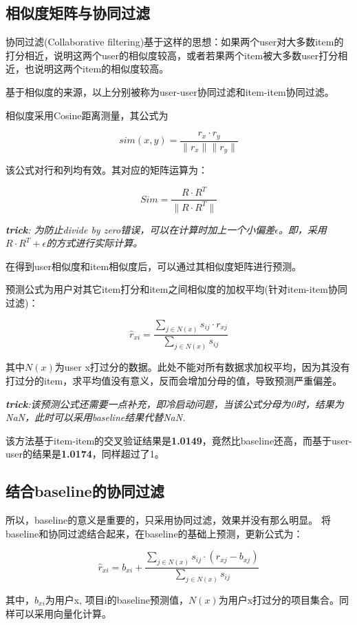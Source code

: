 \documentclass[utf8, a4paper,12pt, onecolumn]{ctexart}
\begin{document}
\begin{spacing}{1.3}
\subsection{相似度矩阵与协同过滤}

协同过滤(Collaborative filtering)基于这样的思想：如果两个user对大多数item的打分相近，说明这两个user的相似度较高，或者若果两个item被大多数user打分相近，也说明这两个item的相似度较高。

基于相似度的来源，以上分别被称为user-user协同过滤和item-item协同过滤。

相似度采用Cosine距离测量，其公式为

\[sim(x,y) = \frac{r_x \cdot r_y}{\| r_x \| \| r_y\|}\]

该公式对行和列均有效。其对应的矩阵运算为：

\[Sim = \frac{R \cdot R^T}{\| R\cdot R^T \|}\]

\textit{\textbf{trick}: 为防止divide by zero错误，可以在计算时加上一个小偏差$\epsilon$。即，采用$R\cdot R^T + \epsilon$的方式进行实际计算。}

在得到user相似度和item相似度后，可以通过其相似度矩阵进行预测。

预测公式为用户对其它item打分和item之间相似度的加权平均(针对item-item协同过滤)：

\[\hat{r}_{xi} = \frac{\sum_{j \in N(x)} s_{ij} \cdot r_{xj}}{\sum_{j \in N(x)} s_{ij}} \]

其中$N(x)$为user x打过分的数据。此处不能对所有数据求加权平均，因为其没有打过分的item，求平均值没有意义，反而会增加分母的值，导致预测严重偏差。

\textit{\textbf{trick}:该预测公式还需要一点补充，即冷启动问题，当该公式分母为0时，结果为NaN，此时可以采用baseline结果代替NaN.}

该方法基于item-item的交叉验证结果是\textbf{1.0149}，竟然比baseline还高，而基于user-user的结果是\textbf{1.0174}，同样超过了1。

\subsection{结合baseline的协同过滤}
所以，baseline的意义是重要的，只采用协同过滤，效果并没有那么明显。
将baseline和协同过滤结合起来，在baseline的基础上预测，更新公式为：

\[\hat{r}_{xi} = b_{xi}  + \frac{\sum_{j \in N(x)} s_{ij} \cdot (r_{xj} - b_{xj})}{\sum_{j \in N(x)} s_{ij}} \]

其中，$b_{xi}$为用户x, 项目i的baseline预测值，$N(x)$为用户x打过分的项目集合。同样可以采用向量化计算。


\end{spacing}
\end{document}
